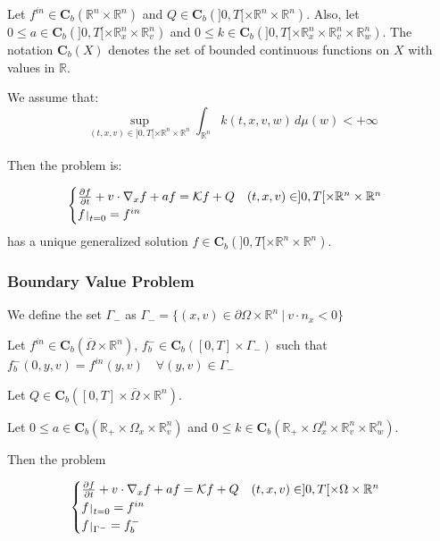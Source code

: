 \documentclass[a4paper, 11pt]{article}
\def\restriction#1#2{\mathchoice
	{\setbox1\hbox{${\displaystyle #1}_{\scriptstyle #2}$}
		\restrictionaux{#1}{#2}}
	{\setbox1\hbox{${\textstyle #1}_{\scriptstyle #2}$}
		\restrictionaux{#1}{#2}}
	{\setbox1\hbox{${\scriptstyle #1}_{\scriptscriptstyle #2}$}
		\restrictionaux{#1}{#2}}
	{\setbox1\hbox{${\scriptscriptstyle #1}_{\scriptscriptstyle #2}$}
		\restrictionaux{#1}{#2}}}
\def\restrictionaux#1#2{{#1\,\smash{\vrule height .8\ht1 depth .85\dp1}}_{\,#2}}
\begin{document}
Let $f^{in} \in \mathbf{C}_b(\mathbb{R}^n \times \mathbb{R}^n)$ and $Q \in \mathbf{C}_b(]0,T[ \times \mathbb{R}^n \times \mathbb{R}^n)$. Also, let $0 \leq a \in \mathbf{C}_b(]0,T[ \times \mathbb{R}_x^n \times \mathbb{R}_v^n)$ and $0 \leq k \in \mathbf{C}_b(]0,T[ \times \mathbb{R}_x^n \times \mathbb{R}_v^n \times \mathbb{R}_w^n)$. The notation $\mathbf{C}_b(X)$ denotes the set of bounded continuous functions on $X$ with values in $\mathbb{R}$.


We assume that:  \[ \underset{(t,x,v) \in ]0,T[ \times \mathbb{R}^n \times \mathbb{R}^n}{\sup} \int_{\mathbb{R}^n} k(t,x,v,w) \, d\mu(w) < +\infty \]

\paragraph{}

Then the problem is:

\[
\begin{cases}
	\frac{\partial f}{\partial t}+v \cdot \nabla_x f +af =   \mathcal{K} f +Q \quad (t,x,v) \in ]0,T[ \times \mathbb{R}^n \times \mathbb{R}^n\\
	\restriction{f}{t=0}= f^{in}
\end{cases}
\]
has a unique generalized solution $f \in \mathbf{C}_b(]0,T[ \times \mathbb{R}^n \times \mathbb{R}^n)$.

\subsubsection{Boundary Value Problem}

We define the set $\Gamma_-$ as $\Gamma_-= \{(x,v) \in \partial \Omega \times \mathbb{R}^n ~ | ~ v\cdot n_x<0\}$

Let $f^{in} \in \mathbf{C}_b(\overline{\Omega} \times \mathbb{R}^n)$, $f_b^- \in \mathbf{C}_b([0,T] \times \Gamma_-)$ such that $f_b^-(0,y,v)=f^{in}(y,v) \quad \forall (y,v) \in \Gamma_-$

Let $Q \in \mathbf{C}_b([0,T] \times \overline{\Omega} \times \mathbb{R}^n)$.

Let $0 \leq a \in \mathbf{C}_b(\mathbb{R}_+ \times \Omega_x \times \mathbb{R}_v^n)$ and $0 \leq k \in \mathbf{C}_b(\mathbb{R}_+ \times \Omega_x^n \times \mathbb{R}_v^n \times \mathbb{R}_w^n)$.

Then the problem

\[
\begin{cases}
	\frac{\partial f}{\partial t}+v \cdot \nabla_x f +af =   \mathcal{K} f +Q \quad (t,x,v) \in ]0,T[ \times \Omega \times \mathbb{R}^n\\
	\restriction{f}{t=0}= f^{in}\\
	\restriction{f}{\Gamma^-}=f_b^-
\end{cases}
\]
\end{document}
